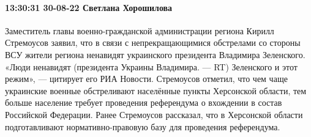 \paragraph{13:30:31 30-08-22 Светлана Хорошилова}

Заместитель главы военно-гражданской администрации региона Кирилл Стремоусов заявил, что в связи с непрекращающимися обстрелами со стороны ВСУ жители региона ненавидят украинского президента Владимира Зеленского.
«Люди ненавидят (президента Украины Владимира. — RT) Зеленского и этот режим», — цитирует его РИА Новости. Стремоусов отметил, что чем чаще украинские военные обстреливают населённые пункты Херсонской области, тем больше население требует проведения референдума о вхождении в состав Российской Федерации.
Ранее Стремоусов рассказал, что в Херсонской области подготавливают нормативно-правовую базу для проведения референдума.


